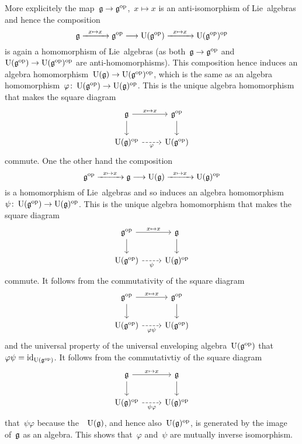 \begin{example}
  More explicitely the map~$\glie \to \glie^{\op}$,~$x \mapsto x$ is an anti-isomorphism of Lie~algebras and hence the composition
  \[
    \glie
    \xto{x \mapsto x}
    \glie^{\op}
    \to
    \Univ(\glie^{\op})
    \xto{x \mapsto x}
    \Univ(\glie^{\op})^{\op}
  \]
  is again a homomorphism of Lie~algebras (as both~$\glie \to \glie^{\op}$ and~$\Univ(\glie^{\op}) \to \Univ(\glie^{\op})^{\op}$ are anti-homomorphisms).
  This composition hence induces an algebra homomorphism~$\Univ(\glie) \to \Univ(\glie^{\op})^{\op}$, which is the same as an algebra homomorphism~$\varphi \colon \Univ(\glie^{\op}) \to \Univ(\glie)^{\op}$.
  This is the unique algebra homomorphism that makes the square diagram
  \[
    \begin{tikzcd}
      \glie
      \arrow{r}[above]{x \mapsto x}
      \arrow{d}
      &
      \glie^{\op}
      \arrow{d}
      \\
      \Univ(\glie)^{\op}
      \arrow[dashed]{r}[below]{\varphi}
      &
      \Univ(\glie^{\op})
    \end{tikzcd}
  \]
  commute.
  One the other hand the composition
  \[
    \glie^{\op}
    \xto{x \mapsto x}
    \glie
    \to
    \Univ(\glie)
    \xto{x \mapsto x}
    \Univ(\glie)^{\op}
  \]
  is a homomorphism of Lie~algebras and so induces an algebra homomorphism~$\psi \colon \Univ(\glie^{\op}) \to \Univ(\glie)^{\op}$.
  This is the unique algebra homomorphism that makes the square diagram
  \[
    \begin{tikzcd}
      \glie^{\op}
      \arrow{r}[above]{x \mapsto x}
      \arrow{d}
      &
      \glie
      \arrow{d}
      \\
      \Univ(\glie^{\op})
      \arrow[dashed]{r}[below]{\psi}
      &
      \Univ(\glie)^{\op}
    \end{tikzcd}
  \]
  commute.
  It follows from the commutativity of the square diagram
  \[
    \begin{tikzcd}
      \glie^{\op}
      \arrow{r}[above]{x \mapsto x}
      \arrow{d}
      &
      \glie^{\op}
      \arrow{d}
      \\
      \Univ(\glie^{\op})
      \arrow[dashed]{r}[below]{\varphi \psi}
      &
      \Univ(\glie^{\op})
    \end{tikzcd}
  \]
  and the universal property of the universal enveloping algebra~$\operatorname{U}(\mathfrak{g}^{\mathrm{op}})$ that~$\varphi \psi = \mathrm{id}_{\operatorname{U}(\mathfrak{g}^{\mathrm{op}})}$.
  It follows from the commutativtiy of the square diagram
  \[
    \begin{tikzcd}
      \glie
      \arrow{r}[above]{x \mapsto x}
      \arrow{d}
      &
      \glie
      \arrow{d}
      \\
      \Univ(\glie)^{\op}
      \arrow[dashed]{r}[below]{\psi \varphi}
      &
      \Univ(\glie)^{\op}
    \end{tikzcd}
  \]
  that~$\psi \varphi$ because the~{\algebra{$\kf$}}~$\operatorname{U}(\mathfrak{g})$, and hence also~$\operatorname{U}(\mathfrak{g})^{\mathrm{op}}$, is generated by the image of~$\mathfrak{g}$ as an algebra.
  This shows that~$\varphi$ and~$\psi$ are mutually inverse isomorphism.
  

\end{example}
